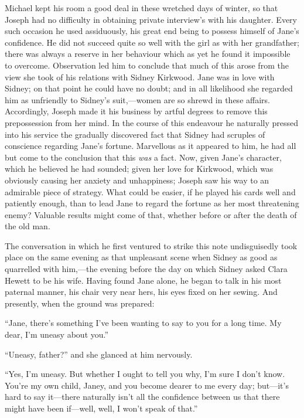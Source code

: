 Michael kept his room a good deal in these wretched days of winter, so
that Joseph had no difficulty in obtaining private interview's with his
daughter. Every such occasion he {}used assiduously, his great end being
to possess himself of Jane's confidence. He did not succeed quite so
well with the girl as with her grandfather; there was always a reserve
in her behaviour which as yet he found it impossible to overcome.
Observation led him to conclude that much of this arose from the view
she took of his relations with Sidney Kirkwood. Jane was in love with
Sidney; on that point he could have no doubt; and in all likelihood she
regarded him as unfriendly to Sidney's suit,---women are so shrewd in
these affairs. Accordingly, Joseph made it his business by artful
degrees to remove this prepossession from her mind. In the course of
this endeavour he naturally pressed into his service the gradually
discovered fact that Sidney had scruples of conscience regarding Jane's
fortune. Marvellous as it appeared to him, he had all but come to the
conclusion that this \emph{was} a fact. Now, given Jane's character,
which he believed he had sounded; given her love for Kirkwood, which was
obviously causing her anxiety and unhappiness; Joseph saw his way to an
admirable piece of strategy. What could be easier, if he played his
cards well and patiently enough, {}than to lead Jane to regard the
fortune as her most threatening enemy? Valuable results might come of
that, whether before or after the death of the old man.

The conversation in which he first ventured to strike this note
undisguisedly took place on the same evening as that unpleasant scene
when Sidney as good as quarrelled with him,---the evening before the day
on which Sidney asked Clara Hewett to be his wife. Having found Jane
alone, he began to talk in his most paternal manner, his chair very near
hers, his eyes fixed on her sewing. And presently, when the ground was
prepared:

``Jane, there's something I've been wanting to say to you for a long
time. My dear, I'm uneasy about you.''

``Uneasy, father?'' and she glanced at him nervously.

``Yes, I'm uneasy. But whether I ought to tell you why, I'm sure I don't
know. You're my own child, Janey, and you become dearer to me every day;
but---it's hard to say it---there naturally isn't all the confidence
between us that there might have been if---well, well, I won't speak of
that.''

